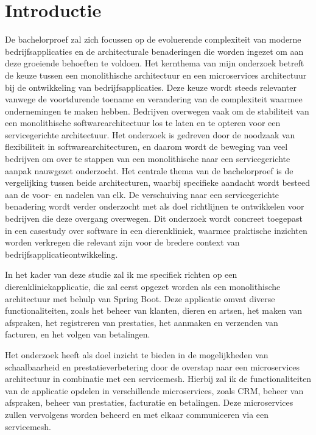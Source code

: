
\section{Introductie}%
\label{sec:introductie}

De bachelorproef zal zich focussen op de evoluerende complexiteit van moderne bedrijfsapplicaties en de architecturale benaderingen die worden ingezet om aan deze groeiende behoeften te voldoen. Het kernthema van mijn onderzoek betreft de keuze tussen een monolithische architectuur en een microservices architectuur bij de ontwikkeling van bedrijfsapplicaties. Deze keuze wordt steeds relevanter vanwege de voortdurende toename en verandering van de complexiteit waarmee ondernemingen te maken hebben. Bedrijven overwegen vaak om de stabiliteit van een monolithische softwarearchitectuur los te laten en te opteren voor een servicegerichte architectuur. Het onderzoek is gedreven door de noodzaak van flexibiliteit in softwarearchitecturen, en daarom wordt de beweging van veel bedrijven om over te stappen van een monolithische naar een servicegerichte aanpak nauwgezet onderzocht. Het centrale thema van de bachelorproef is de vergelijking tussen beide architecturen, waarbij specifieke aandacht wordt besteed aan de voor- en nadelen van elk. De verschuiving naar een servicegerichte benadering wordt verder onderzocht met als doel richtlijnen te ontwikkelen voor bedrijven die deze overgang overwegen. Dit onderzoek wordt concreet toegepast in een casestudy over software in een dierenkliniek, waarmee praktische inzichten worden verkregen die relevant zijn voor de bredere context van bedrijfsapplicatieontwikkeling.

In het kader van deze studie zal ik me specifiek richten op een dierenkliniekapplicatie, die zal eerst opgezet worden als een monolithische architectuur met behulp van Spring Boot. Deze applicatie omvat diverse functionaliteiten, zoals het beheer van klanten, dieren en artsen, het maken van afspraken, het registreren van prestaties, het aanmaken en verzenden van facturen, en het volgen van betalingen.

Het onderzoek heeft als doel inzicht te bieden in de mogelijkheden van schaalbaarheid en prestatieverbetering door de overstap naar een microservices architectuur in combinatie met een servicemesh. Hierbij zal ik de functionaliteiten van de applicatie opdelen in verschillende microservices, zoals CRM, beheer van afspraken, beheer van prestaties, facturatie en betalingen. Deze microservices zullen vervolgens worden beheerd en met elkaar communiceren via een servicemesh.

